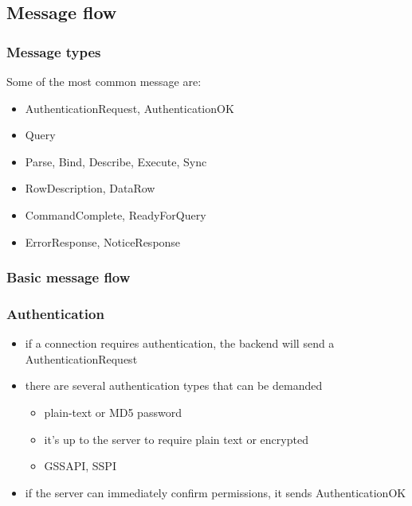 \documentclass{beamer}
\begin{document}
\subsection{Message flow}

\begin{frame}
  \frametitle{Message types}

  Some of the most common message are:

  \begin{itemize}
  \item AuthenticationRequest, AuthenticationOK
  \item Query
  \item Parse, Bind, Describe, Execute, Sync
  \item RowDescription, DataRow
  \item CommandComplete, ReadyForQuery
  \item ErrorResponse, NoticeResponse
  \end{itemize}

\end{frame}

\begin{frame}
  \frametitle{Basic message flow}


\end{frame}

\begin{frame}
  \frametitle{Authentication}

  \begin{itemize}
  \item if a connection requires authentication, the backend will send a
    AuthenticationRequest
  \item there are several authentication types that can be demanded
    \begin{itemize}
    \item plain-text or MD5 password
    \item it's up to the server to require plain text or encrypted
    \item GSSAPI, SSPI
    \end{itemize}
  \item if the server can immediately confirm permissions, it sends
    AuthenticationOK
  \end{itemize}
\end{frame}
\end{document}

